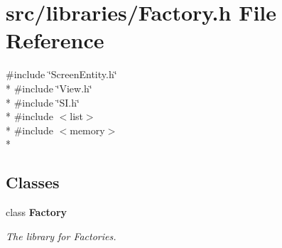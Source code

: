 \section{src/libraries/\-Factory.h File Reference}
\label{_factory_8h}
{\ttfamily \#include \char`\"{}Screen\-Entity.\-h\char`\"{}}\\*
{\ttfamily \#include \char`\"{}View.\-h\char`\"{}}\\*
{\ttfamily \#include \char`\"{}S\-I.\-h\char`\"{}}\\*
{\ttfamily \#include $<$list$>$}\\*
{\ttfamily \#include $<$memory$>$}\\*
\subsection*{Classes}
\begin{DoxyCompactItemize}
\item 
class {\bf Factory}
\begin{DoxyCompactList}\small\item\em The library for Factories. \end{DoxyCompactList}\end{DoxyCompactItemize}
